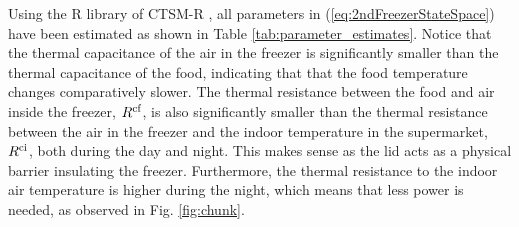 Using the R library of CTSM-R \cite{juhl2016ctsmr}, all parameters in (\ref{eq:2ndFreezerStateSpace}) have been estimated as shown in Table \ref{tab:parameter_estimates}. Notice that the thermal capacitance of the air in the freezer is significantly smaller than the thermal capacitance of the food, indicating that that the food temperature changes comparatively slower. The thermal resistance between the food and air inside the freezer, $R^{\rm{cf}}$, is also significantly smaller than the thermal resistance between the air in the freezer and the indoor temperature in the supermarket, $R^{\rm{ci}}$, both during the day and night. This makes sense as the lid acts as a physical barrier insulating the freezer. Furthermore, the thermal resistance to the indoor air temperature is higher during the night, which means that less power is needed, as  observed in Fig. \ref{fig:chunk}.


